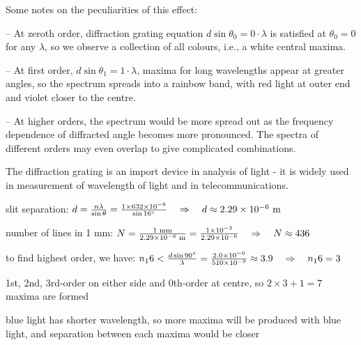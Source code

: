 \newpage
Some notes on the peculiarities of this effect:
\begin{compactitem}
	\item[--] At zeroth order, diffraction grating equation $d\sin\theta_0 = 0\cdot\lambda$ is satisfied at $\theta_0 = 0$ for any $\lambda$, so we observe a collection of all colours, i.e., a white central maxima.
	
	\item[--] At first order, $d\sin\theta_1 = 1\cdot\lambda$, maxima for long wavelengths appear at greater angles, so the spectrum spreads into a rainbow band, with red light at outer end and violet closer to the centre.
	
	\item[--] At higher orders, the spectrum would be more spread out as the frequency dependence of diffracted angle becomes more pronounced. The spectra of different orders may even overlap to give complicated combinations.
\end{compactitem}

The diffraction grating is an import device in analysis of light - it is widely used in measurement of wavelength of light and in telecommunications.


\begin{soln} slit separation: $d = \frac{n\lambda}{\sin\theta} = \frac{1\times632\times10^{-9}}{\sin 16^\circ} \quad \Rightarrow \quad d \approx 2.29 \times 10^{-6} \text{ m}$

number of lines in 1 mm: $N = \frac{1 \text{ mm}}{2.29 \times 10^{-6} \text{ m}} = \frac{1 \times 10^{-3}}{2.29 \times 10^{-6}} \quad \Rightarrow \quad N \approx 436$ \end{soln}


\begin{soln} to find highest order, we have: $n_16 < \frac{d\sin 90^\circ}{\lambda} = \frac{2.0\times10^{-6}}{510\times10^{-9}} \approx 3.9 \quad \Rightarrow \quad n_16 = 3$

1st, 2nd, 3rd-order on either side and 0th-order at centre, so $ 2\times 3 + 1 = 7$ maxima are formed

blue light has shorter wavelength, so more maxima will be produced with blue light, and separation between each maxima would be closer \end{soln}

